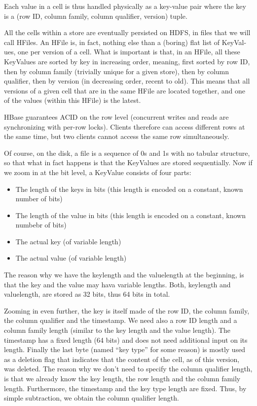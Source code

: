 Each value in a cell is thus handled physically as a key-value pair where the key is a (row ID, column family, column qualifier, version) tuple.

All the cells within a store are eventually persisted on HDFS, in files that we will call HFiles. An HFile is, in fact, nothing else than a (boring) flat list of KeyVal- ues, one per version of a cell. What is important is that, in an HFile, all these KeyValues are sorted by key in increasing order, meaning, first sorted by row ID, then by column family (trivially unique for a given store), then by column qualifier, then by version (in decreasing order, recent to old). This means that all versions of a given cell that are in the same HFile are located together, and one of the values (within this HFile) is the latest.

HBase guarantees ACID on the row level (concurrent writes and reads are synchronizing with per-row locks). Clients therefore can access different rows at the same time, but two clients cannot access the same row simultaneously.

Of course, on the disk, a file is a sequence of 0s and 1s with no tabular structure, so that what in fact happens is that the KeyValues are stored sequentially. Now if we zoom in at the bit level, a KeyValue consists of four parts:
\begin{itemize}
    \item The length of the keys in bits (this length is encoded on a constant, known number of bits)
    \item The length of the value in bits (this length is encoded on a constant, known numbebr of bits)
    \item The actual key (of variable length)
    \item The actual value (of variable length)
\end{itemize}
The reason why we have the keylength and the valuelength at the beginning, is that the key and the value may hava variable lengths. Both, keylength and valuelength, are stored as 32 bits, thus 64 bits in total.

Zooming in even further, the key is itself made of the row ID, the column family, the column qualifier and the timestamp. We need also a row ID length and a column family length (similar to the key length and the value length). The timestamp has a fixed length (64 bits) and does not need additional input on its length. Finally the last byte (named “key type” for some reason) is mostly used as a deletion flag that indicates that the content of the cell, as of this version, was deleted. The reason why we don't need to specify the column qualifier length, is that we already know the key length, the row length and the column family length. Furthermore, the timestamp and the key type length are fixed. Thus, by simple subtraction, we obtain the column qualifier length.

